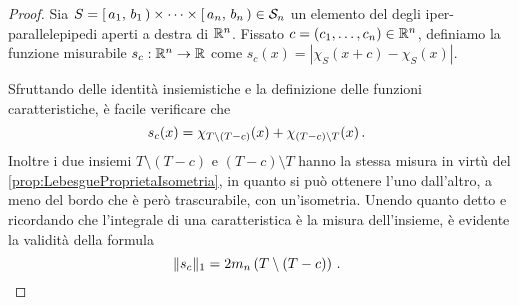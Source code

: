 \begin{proof}
	Sia $S=\left[\,a_1,\,b_1\,\right)\times\cdots\times\left[\,a_n,\,b_n\,\right)\in\mathcal S_n$ un elemento del \semiring{} degli iper-parallelepipedi aperti a destra di $\mathbb R^n$.
	Fissato $c=(c_1,\dots,c_n)\in\mathbb R^n$, definiamo la funzione misurabile $s_c:\mathbb R^n\to\mathbb R$ come $s_c(x)=\left\lvert\chi_S(x+c)-\chi_S(x)\right\rvert$.
	
	Sfruttando delle identità insiemistiche e la definizione delle funzioni caratteristiche, è facile verificare che
	\begin{equation*}
		s_c(x)=\chi_{T\setminus\left(T-c\right)}(x)+\chi_{\left(T-c\right)\setminus T}(x)\, \text{. }
	\end{equation*}
	Inoltre i due insiemi $T\setminus\left(T-c\right)$ e $\left(T-c\right)\setminus T$ hanno la stessa misura in virtù del \cref{prop:LebesgueProprietaIsometria}, in quanto si può ottenere l'uno dall'altro, a meno del bordo che è però trascurabile, con un'isometria.
	Unendo quanto detto e ricordando che l'integrale di una caratteristica è la misura dell'insieme, è evidente la validità della formula
	\begin{equation} \label{eq:IdentitaIntegraleContinuitaL1}
		\Vert s_c\Vert_1=2m_n\left(T\setminus\left(T-c\right)\right)\, \text{. }
	\end{equation}
	

\end{proof}
